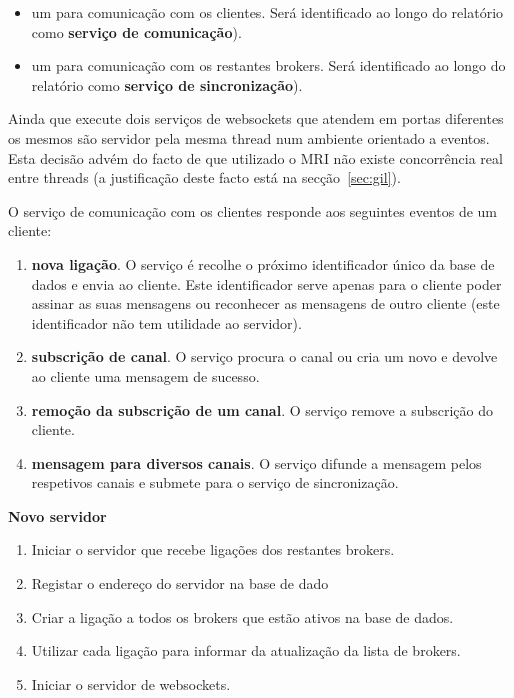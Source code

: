 \begin{itemize}
\item um para comunicação com os clientes. Será identificado ao longo do relatório como \textbf{serviço de comunicação}).
\item um para comunicação com os restantes brokers. Será identificado ao longo do relatório como \textbf{serviço de sincronização}).
\end{itemize}

Ainda que execute dois serviços de websockets que atendem em portas diferentes os mesmos são servidor pela mesma thread num ambiente orientado a eventos. Esta decisão advém do facto de que utilizado o MRI não existe concorrência real entre threads (a justificação deste facto está na secção~\ref{sec:gil}).

O serviço de comunicação com os clientes responde aos seguintes eventos de um cliente:

\begin{enumerate}
\item \textbf{nova ligação}. O serviço é recolhe o próximo identificador único da base de dados e envia ao cliente. Este identificador serve apenas para o cliente poder assinar as suas mensagens ou reconhecer as mensagens de outro cliente (este identificador não tem utilidade ao servidor).
\item \textbf{subscrição de canal}. O serviço procura o canal ou cria um novo e devolve ao cliente uma mensagem de sucesso.
\item \textbf{remoção da subscrição de um canal}. O serviço remove a subscrição do cliente.
\item \textbf{mensagem para diversos canais}. O serviço difunde a mensagem pelos respetivos canais e submete para o serviço de sincronização.
\end{enumerate}

\hl{}

\textbf{Novo servidor}
\begin{enumerate}
\item Iniciar o servidor que recebe ligações dos restantes brokers.
\item Registar o endereço do servidor na base de dado
\item Criar a ligação a todos os brokers que estão ativos na base de dados.
\item Utilizar cada ligação para informar da atualização da lista de brokers.
\item Iniciar o servidor de websockets.
\end{enumerate}


